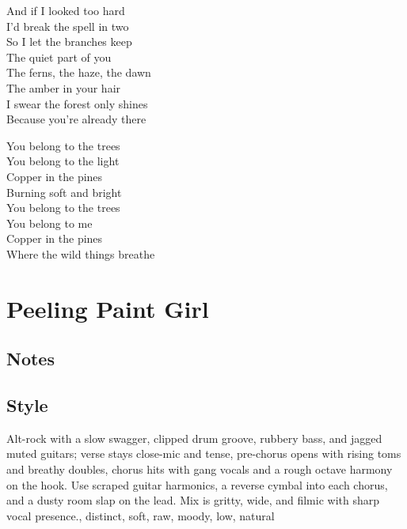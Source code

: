 \begin{lyrics}
And if I looked too hard\\
I’d break the spell in two\\
So I let the branches keep\\
The quiet part of you\\
The ferns, the haze, the dawn\\
The amber in your hair\\
I swear the forest only shines\\
Because you’re already there

You belong to the trees\\
You belong to the light\\
Copper in the pines\\
Burning soft and bright\\
You belong to the trees\\
You belong to me\\
Copper in the pines\\
Where the wild things breathe
\end{lyrics}

\section{Peeling Paint Girl}
\subsection{Notes}
\subsection{Style}
Alt-rock with a slow swagger, clipped drum groove, rubbery bass, and jagged muted guitars; verse stays close-mic and tense, pre-chorus opens with rising toms and breathy doubles, chorus hits with gang vocals and a rough octave harmony on the hook. Use scraped guitar harmonics, a reverse cymbal into each chorus, and a dusty room slap on the lead. Mix is gritty, wide, and filmic with sharp vocal presence., distinct, soft, raw, moody, low, natural

